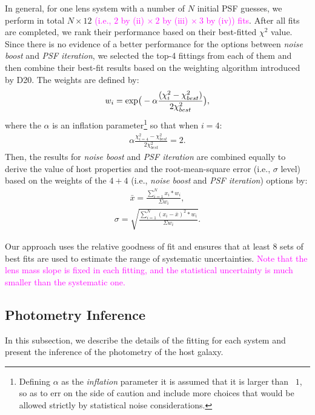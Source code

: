 \documentclass[fleqn,usenatbib]{mnras}
\newcommand{\pink}[1]{{\textcolor{magenta}{#1}}}
\begin{document}
In general, for one lens system with a number of $N$ initial PSF guesses, we perform in total $N\times12$ \pink{(i.e., $2$ by (ii) $\times~2$ by (iii) $\times~3$ by (iv)) fits}. After all fits are completed, we rank their performance based on their best-fitted $\chi^2$ value. Since there is no evidence of a better performance for the options between {\it noise boost} and {\it PSF iteration}, we selected the top-4 fittings from each of them and then combine their best-fit results based on the weighting algorithm introduced by D20. The weights are defined by:
\begin{eqnarray}
\label{eq:weights}
w_i = {\rm exp} \big(- \alpha \frac{ (\chi_i ^2 - \chi_{best} ^2 )}{2 \chi_{best} ^2} \big),
\end{eqnarray} 
where the $\alpha$ is an inflation parameter\footnote{Defining $\alpha$ as the {\it inflation} parameter it is assumed that it is larger than ~$1$, so as to err on the side of caution and include more choices that would be allowed strictly by statistical noise considerations.} so that when $i=4$:
\begin{eqnarray}
\label{eq:alpha}
\alpha \frac{ \chi_{i=4} ^2 - \chi_{best} ^2 }{2 \chi_{best} ^2} = 2.
\end{eqnarray} 
Then, the results for {\it noise boost} and {\it PSF iteration} are combined equally to derive the value of host properties and the root-mean-square error (i.e., $\sigma$ level) based on the weights of the $4+4$ (i.e., {\it noise boost} and {\it PSF iteration}) options by:
\begin{eqnarray}
\label{eq:infer_value}
\bar{x}  =  \frac{  \sum_{i=1}^{N}   x_i * w_i  }{\Sigma w_i} ,
\end{eqnarray} 
\begin{eqnarray}
\label{eq:infer_scatter}
\sigma =   \sqrt{ \frac{  \sum_{i=1}^{N}   (x_i -  \bar{x} ) ^2 * w_i  }{\Sigma w_i} }.
\end{eqnarray} 

Our approach uses the relative goodness of fit and ensures that at least 8 sets of best fits are used to estimate the range of systematic uncertainties. \pink{Note that the lens mass slope is fixed in each fitting, and the statistical uncertainty is much smaller than the systematic one.} 

\subsection{Photometry Inference}\label{sec:photometry}
In this subsection, we describe the details of the fitting for each system and present the inference of the photometry of the host galaxy.
\end{document}
